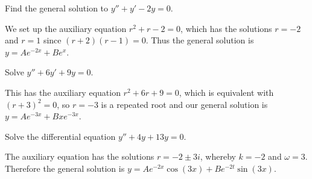 \begin{example}
	Find the general solution to $y'' + y' - 2y = 0$.

	We set up the auxiliary equation $r^2 + r - 2 = 0$, which has the solutions $r = -2$ and $r = 1$ since $(r + 2)(r - 1) = 0$.
	Thus the general solution is $y = A e^{-2 x} + B e^{x}$.
\end{example}

\begin{example}
	Solve $y'' + 6 y' + 9 y = 0$.

	This has the auxiliary equation $r^2 + 6 r + 9 = 0$, which is equivalent with $(r + 3)^2 = 0$, so $r = -3$ is a repeated root and our general solution is $y = A e^{-3x} + B x e^{-3x}$.
\end{example}

\begin{example}
	Solve the differential equation $y'' + 4 y + 13 y = 0$.

	The auxiliary equation has the solutions $r = -2 \pm 3 i$, whereby $k = -2$ and $\omega = 3$.
	Therefore the general solution is $y = A e^{-2 x} \cos(3 x) + B e^{-2 t} \sin(3 x)$. 
\end{example}
